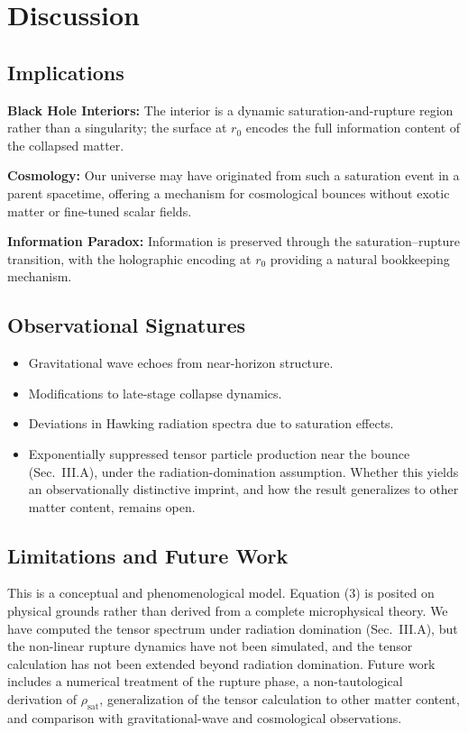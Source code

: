 \documentclass[onecolumn,PRD,amsmath,amssymb,aps,nofootinbib,superscriptaddress,11pt]{revtex4-2}
\begin{document}
\section{Discussion}
\subsection{Implications}
\textbf{Black Hole Interiors:} The interior is a dynamic saturation-and-rupture region rather than a singularity; the surface at $r_0$ encodes the full information content of the collapsed matter.

\textbf{Cosmology:} Our universe may have originated from such a saturation event in a parent spacetime, offering a mechanism for cosmological bounces without exotic matter or fine-tuned scalar fields.

\textbf{Information Paradox:} Information is preserved through the saturation--rupture transition, with the holographic encoding at $r_0$ providing a natural bookkeeping mechanism.

\subsection{Observational Signatures}
\begin{itemize}
\item Gravitational wave echoes from near-horizon structure.
\item Modifications to late-stage collapse dynamics.
\item Deviations in Hawking radiation spectra due to saturation effects.
\item Exponentially suppressed tensor particle production near the bounce (Sec.~III.A), under the radiation-domination assumption. Whether this yields an observationally distinctive imprint, and how the result generalizes to other matter content, remains open.
\end{itemize}

\subsection{Limitations and Future Work}
This is a conceptual and phenomenological model. Equation (3) is posited on physical grounds rather than derived from a complete microphysical theory. We have computed the tensor spectrum under radiation domination (Sec.~III.A), but the non-linear rupture dynamics have not been simulated, and the tensor calculation has not been extended beyond radiation domination. Future work includes a numerical treatment of the rupture phase, a non-tautological derivation of $\rho_{\text{sat}}$, generalization of the tensor calculation to other matter content, and comparison with gravitational-wave and cosmological observations.
\end{document}
